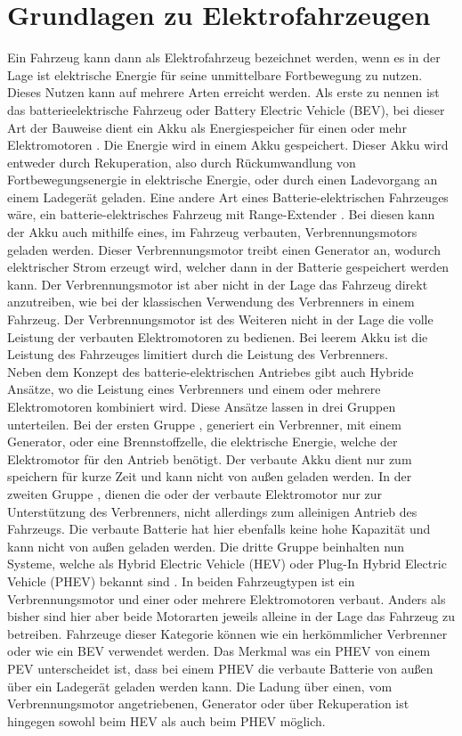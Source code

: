 \section{Grundlagen zu Elektrofahrzeugen}
Ein Fahrzeug kann dann als Elektrofahrzeug bezeichnet werden, wenn es in der Lage ist elektrische Energie für seine unmittelbare Fortbewegung zu nutzen. Dieses Nutzen kann auf mehrere Arten erreicht werden. Als erste zu nennen ist das batterieelektrische Fahrzeug oder Battery Electric Vehicle (BEV), bei dieser Art der Bauweise dient ein Akku als Energiespeicher für einen oder mehr Elektromotoren \cite{e_auto}. Die Energie wird in einem Akku gespeichert. Dieser Akku wird entweder durch Rekuperation, also durch Rückumwandlung von Fortbewegungsenergie in elektrische Energie, oder durch einen Ladevorgang an einem Ladegerät geladen. Eine andere Art eines Batterie-elektrischen Fahrzeuges wäre, ein batterie-elektrisches Fahrzeug mit Range-Extender \cite{e_auto}. Bei diesen kann der Akku auch mithilfe eines, im Fahrzeug verbauten, Verbrennungsmotors geladen werden. Dieser Verbrennungsmotor treibt einen Generator an, wodurch elektrischer Strom erzeugt wird, welcher dann in der Batterie gespeichert werden kann. Der Verbrennungsmotor ist aber nicht in der Lage das Fahrzeug direkt anzutreiben, wie bei der klassischen Verwendung des Verbrenners in einem Fahrzeug. Der Verbrennungsmotor ist des Weiteren nicht in der Lage die volle Leistung der verbauten Elektromotoren zu bedienen. Bei leerem Akku ist die Leistung des Fahrzeuges limitiert durch die Leistung des Verbrenners. \\
Neben dem Konzept des batterie-elektrischen Antriebes gibt auch Hybride Ansätze, wo die Leistung eines Verbrenners und einem oder mehrere Elektromotoren kombiniert wird. Diese Ansätze lassen in drei Gruppen unterteilen. Bei der ersten Gruppe \cite{e_auto}, generiert ein Verbrenner, mit einem Generator, oder eine Brennstoffzelle, die elektrische Energie, welche der Elektromotor für den Antrieb benötigt. Der verbaute Akku dient nur zum speichern für kurze Zeit und kann nicht von außen geladen werden. In der zweiten Gruppe \cite{e_auto}, dienen die oder der verbaute Elektromotor nur zur Unterstützung des Verbrenners, nicht allerdings zum alleinigen Antrieb des Fahrzeugs. Die verbaute Batterie hat hier ebenfalls keine hohe Kapazität und kann nicht von außen geladen werden. Die dritte Gruppe beinhalten nun Systeme, welche als Hybrid Electric Vehicle (HEV) oder Plug-In Hybrid Electric Vehicle (PHEV) bekannt sind \cite{e_auto}. In beiden Fahrzeugtypen ist ein Verbrennungsmotor und einer oder mehrere Elektromotoren verbaut. Anders als bisher sind hier aber beide Motorarten jeweils alleine in der Lage das Fahrzeug zu betreiben. Fahrzeuge dieser Kategorie können wie ein herkömmlicher Verbrenner oder wie ein BEV verwendet werden. Das Merkmal was ein PHEV von einem PEV unterscheidet ist, dass bei einem PHEV die verbaute Batterie von außen über ein Ladegerät geladen werden kann. Die Ladung über einen, vom Verbrennungsmotor angetriebenen, Generator oder über Rekuperation ist hingegen sowohl beim HEV als auch beim PHEV möglich.\\

